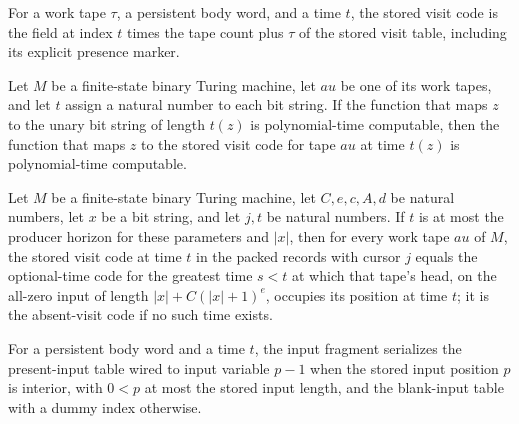 \begin{definition}
\label{Complexity.clA5Visit}
\leanok
{}
For a work tape $\tau$, a persistent body word, and a time $t$, the stored visit code is the field at index $t$ times the tape count plus $\tau$ of the stored visit table, including its explicit presence marker.
\end{definition}

\begin{lemma}
\label{Complexity.clA5Visit_native}
\leanok
{}
Let $M$ be a finite-state binary Turing machine, let $	au$ be one of its work tapes, and
let $t$ assign a natural number to each bit string. If the function that maps $z$ to the
unary bit string of length $t(z)$ is polynomial-time computable, then the function that
maps $z$ to the stored visit code for tape $	au$ at time $t(z)$ is polynomial-time
computable.
\end{lemma}

\begin{lemma}
\label{Complexity.clA5Visit_exact}
\leanok
{}
Let $M$ be a finite-state binary Turing machine, let $C,e,c,A,d$ be natural numbers, let
$x$ be a bit string, and let $j,t$ be natural numbers. If $t$ is at most the producer
horizon for these parameters and $|x|$, then for every work tape $	au$ of $M$, the
stored visit code at time $t$ in the packed records with cursor $j$ equals the
optional-time code for the greatest time $s<t$ at which that tape's head, on the
all-zero input of length $|x|+C(|x|+1)^e$, occupies its position at time $t$; it is the
absent-visit code if no such time exists.
\end{lemma}

\begin{definition}
\label{Complexity.clA5InputFragment}
\leanok
{}
For a persistent body word and a time $t$, the input fragment serializes the present-input table wired to input variable $p - 1$ when the stored input position $p$ is interior, with $0 < p$ at most the stored input length, and the blank-input table with a dummy index otherwise.
\end{definition}

